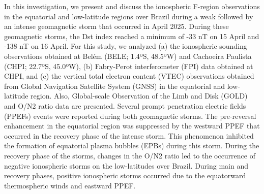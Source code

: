 \documentclass[11pt,a4paper]{article}
\newenvironment{EntryAbstract}[1][\normalsize]
  {\begingroup #1 \setlength{\parskip}{0.55em}\sloppy\noindent\ignorespaces}
  {\par\endgroup}
\begin{document}
\begin{EntryAbstract}[\normalsize]
In this investigation, we present and discuss the ionospheric F-region observations in the equatorial and low-latitude regions over Brazil during a weak followed by an intense geomagnetic storm that occurred in April 2025. During these geomagnetic storms, the Dst index reached a minimum of -33 nT on 15 April and -138 nT on 16 April. For this study, we analyzed (a) the ionospheric sounding observations obtained at Belém (BELE; 1.4ºS, 48.5ºW) and Cachoeira Paulista (CHPI; 22.7ºS, 45.0ºW), (b) Fabry-Perot interferometer (FPI) data obtained at CHPI, and (c) the vertical total electron content (VTEC) observations obtained from Global Navigation Satellite System (GNSS) in the equatorial and low-latitude region. Also, Global-scale Observation of the Limb and Disk (GOLD) and O/N2 ratio data are presented. Several prompt penetration electric fields (PPEFs) events were reported during both geomagnetic storms. The pre-reversal enhancement in the equatorial region was suppressed by the westward PPEF that occurred in the recovery phase of the intense storm. This phenomenon inhibited the formation of equatorial plasma bubbles (EPBs) during this storm. During the recovery phase of the storms, changes in the O/N2 ratio led to the occurrence of negative ionospheric storms on the low-latitudes over Brazil. During main and recovery phases, positive ionospheric storms occurred due to the equatorward thermospheric winds and eastward PPEF.
\end{EntryAbstract}
\end{document}
